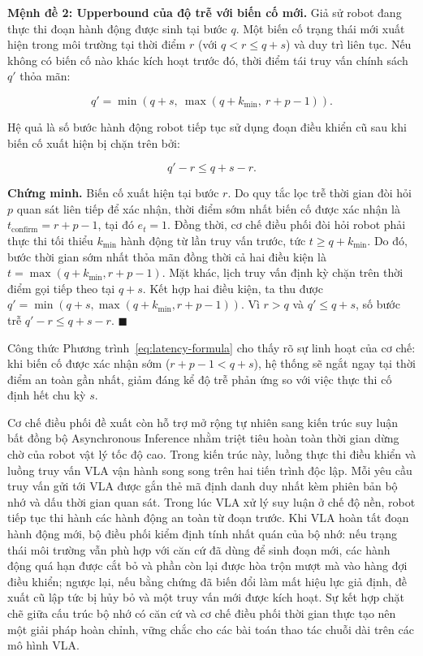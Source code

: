 \textbf{Mệnh đề 2: Upperbound của độ trễ với biến cố mới.} Giả sử robot đang thực thi đoạn hành động được sinh tại bước $q$. Một biến cố trạng thái mới xuất hiện trong môi trường tại thời điểm $r$ (với $q < r \le q + s$) và duy trì liên tục. Nếu không có biến cố nào khác kích hoạt trước đó, thời điểm tái truy vấn chính sách $q'$ thỏa mãn:

\begin{equation}
q' = \min(q + s,\ \max(q + k_{\min},\ r + p - 1)).
\label{eq:latency-formula}
\end{equation}

Hệ quả là số bước hành động robot tiếp tục sử dụng đoạn điều khiển cũ sau khi biến cố xuất hiện bị chặn trên bởi:

\begin{equation}
q' - r \le q + s - r.
\label{eq:latency-bound}
\end{equation}

\textbf{Chứng minh.} Biến cố xuất hiện tại bước $r$. Do quy tắc lọc trễ thời gian đòi hỏi $p$ quan sát liên tiếp để xác nhận, thời điểm sớm nhất biến cố được xác nhận là $t_{\mathrm{confirm}} = r + p - 1$, tại đó $e_t = 1$. Đồng thời, cơ chế điều phối đòi hỏi robot phải thực thi tối thiểu $k_{\min}$ hành động từ lần truy vấn trước, tức $t \ge q + k_{\min}$. Do đó, bước thời gian sớm nhất thỏa mãn đồng thời cả hai điều kiện là $t = \max(q + k_{\min}, r + p - 1)$. Mặt khác, lịch truy vấn định kỳ chặn trên thời điểm gọi tiếp theo tại $q + s$. Kết hợp hai điều kiện, ta thu được $q' = \min(q + s, \max(q + k_{\min}, r + p - 1))$. Vì $r > q$ và $q' \le q + s$, số bước trễ $q' - r \le q + s - r$. $\blacksquare$

Công thức Phương trình~\eqref{eq:latency-formula} cho thấy rõ sự linh hoạt của cơ chế: khi biến cố được xác nhận sớm ($r + p - 1 < q + s$), hệ thống sẽ ngắt ngay tại thời điểm an toàn gần nhất, giảm đáng kể độ trễ phản ứng so với việc thực thi cố định hết chu kỳ $s$.

Cơ chế điều phối đề xuất còn hỗ trợ mở rộng tự nhiên sang kiến trúc suy luận bất đồng bộ Asynchronous Inference nhằm triệt tiêu hoàn toàn thời gian dừng chờ của robot vật lý tốc độ cao. Trong kiến trúc này, luồng thực thi điều khiển và luồng truy vấn VLA vận hành song song trên hai tiến trình độc lập. Mỗi yêu cầu truy vấn gửi tới VLA được gắn thẻ mã định danh duy nhất kèm phiên bản bộ nhớ và dấu thời gian quan sát. Trong lúc VLA xử lý suy luận ở chế độ nền, robot tiếp tục thi hành các hành động an toàn từ đoạn trước. Khi VLA hoàn tất đoạn hành động mới, bộ điều phối kiểm định tính nhất quán của bộ nhớ: nếu trạng thái môi trường vẫn phù hợp với căn cứ đã dùng để sinh đoạn mới, các hành động quá hạn được cắt bỏ và phần còn lại được hòa trộn mượt mà vào hàng đợi điều khiển; ngược lại, nếu bằng chứng đã biến đổi làm mất hiệu lực giả định, đề xuất cũ lập tức bị hủy bỏ và một truy vấn mới được kích hoạt. Sự kết hợp chặt chẽ giữa cấu trúc bộ nhớ có căn cứ và cơ chế điều phối thời gian thực tạo nên một giải pháp hoàn chỉnh, vững chắc cho các bài toán thao tác chuỗi dài trên các mô hình VLA.
